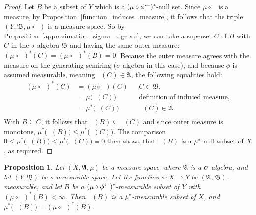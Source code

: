 \documentclass[
twoside=true,
paper=letter,
fontsize=9pt,
pagesize=auto,
leqno,
openany,
headsepline,
overfullrule,
]{scrbook}
\theoremstyle{plain}
\theoremstyle{plain}
\newtheorem{prop}[thm]{Proposition}
\theoremstyle{definition}
\theoremstyle{bfnoteitalic}
\theoremstyle{bfnoteroman}
\newcommand{\sigalg}[1]{\mathfrak{#1}}
\newcommand{\textsigma}{\hbox{\large{$\sigma$}}\kern-1pt}
\newcommand{\preimage}[1]{\mathop{#1^{\leftarrow}}}
\newcommand{\sigmaalgebra}{\sigalg{A}}
\newcommand{\sigmaalgebraii}{\sigalg{B}}
\newcommand{\kernast}{\ast\kern-1pt}
\newcommand{\measurespace}{X}
\newcommand{\measurespaceii}{Y}
\newcommand{\measure}{\mu}
\begin{document}
\begin{proof}
Let $B$ be a subset of $\measurespaceii$ which is a $(\measure\circ\preimage{\phi})^\kernast$-null set. Since $\measure\circ\preimage{\phi}$ is a measure, by Proposition~\ref{function_induces_measure}, it follows that
the triple $(\measurespaceii, \sigmaalgebraii, \measure\circ\preimage{\phi})$ is a measure space. So by Proposition~\ref{approximation_sigma_algebra}, we can take a superset $C$ of $B$ with $C$ in the \textsigma-algebra $\sigmaalgebraii$ and having the same outer measure: 
$(\measure\circ\preimage{\phi})^*(C) =
(\measure\circ\preimage{\phi})^*(B) =0$.
Because the outer measure agrees with the measure on the generating semiring (\textsigma-algebra in this case), and because $\phi$ is assumed measurable, meaning $\preimage{\phi}(C)\in\sigmaalgebra$, the following equalities hold:
\begin{align*}
(\measure\circ\preimage{\phi})^*(C)
& = (\measure\circ\preimage{\phi})(C)
&& \text{$C\in\sigmaalgebraii$,}
\\
& = \measure\bigl(\preimage{\phi}(C)\bigr)
&& \text{definition of induced measure,}
\\
& = \measure^*\bigl(\preimage{\phi}(C)\bigr)
&& \text{$\preimage{\phi}(C)\in\sigmaalgebra$.}
\\
\end{align*}
With $B\subseteq C$, it follows that $\preimage{\phi}(B)\subseteq\preimage{\phi}(C)$ and since outer measure is monotone, 
$\measure^*\bigl(\preimage{\phi}(B)\bigr)
\leq
\measure^*\bigl(\preimage{\phi}(C)\bigr)$. The comparison
$0 \leq \measure^*\bigl(\preimage{\phi}(B)\bigr)
\leq
\measure^*\bigl(\preimage{\phi}(C)\bigr) = 0$ then shows that $\preimage{\phi}(B)$ is a $\measure^\kernast$-null subset of $\measurespace$, as required.
\end{proof}


\begin{prop}\label{preimage_of_a_measurable_set}
Let $(\measurespace,\sigmaalgebra,\measure)$ be a measure space, where $\sigmaalgebra$ is a $\textsigma$-algebra, and let $(\measurespaceii, \sigmaalgebraii)$ be a measurable space.  Let the function $\phi:\measurespace\to\measurespaceii$ be $(\sigmaalgebra, \sigmaalgebraii)$\hyp{}measurable, and let  $B$ be a
$(\measure\circ\preimage{\phi})^\kernast$-measurable subset of $\measurespaceii$ with $(\measure\circ\preimage{\phi})^*(B)< \infty$.
Then $\preimage{\phi}(B)$ is a $\measure^\kernast$-measurable subset of $\measurespace$, and 
$\measure^*\bigl(\preimage{\phi}(B)\bigr) = (\measure\circ\preimage{\phi})^*(B)$. 
\end{prop}
\end{document}
